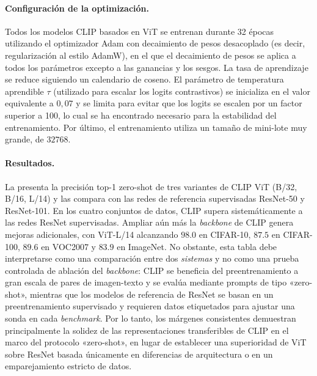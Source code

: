 \documentclass[../../book-main_es.tex]{subfiles}
\begin{document}
\paragraph{Configuración de la optimización.}
Todos los modelos CLIP basados en ViT se entrenan durante 32 épocas utilizando el optimizador Adam 
con decaimiento de pesos desacoplado (es decir, regularización al estilo AdamW), en el que el 
decaimiento de pesos se aplica a todos los parámetros excepto a las ganancias y los sesgos. La tasa 
de aprendizaje se reduce siguiendo un calendario de coseno. El parámetro de temperatura aprendible 
\(\tau\) (utilizado para escalar los logits contrastivos) se inicializa en el valor equivalente a 
\(0,07\) y se limita para evitar que los logits se escalen por un factor superior a 100, lo cual se ha encontrado 
necesario para la estabilidad del entrenamiento. Por último, el entrenamiento utiliza un tamaño 
de mini-lote muy grande, de \(32 768\).

\paragraph{Resultados.} La  presenta la precisión top-1 zero-shot de tres 
variantes de CLIP ViT (B/32, B/16, L/14) y las compara con las 
redes de referencia supervisadas ResNet-50 y ResNet-101.
En los cuatro conjuntos de datos, CLIP supera sistemáticamente a las redes ResNet supervisadas.
Ampliar aún más la \textit{backbone} de CLIP genera mejoras adicionales, con ViT-L/14 alcanzando 
\(98.0\) en CIFAR-10, \(87.5\) en CIFAR-100, \(89.6\) en VOC2007 y \(83.9\) en ImageNet.
No obstante, esta tabla debe interpretarse como una comparación entre dos \emph{sistemas} y no 
como una prueba controlada de ablación del \textit{backbone}: CLIP se beneficia del
preentrenamiento a gran escala de pares de imagen-texto y se evalúa mediante prompts de tipo «zero-shot», 
mientras que los modelos de referencia de ResNet se basan en un preentrenamiento supervisado y 
requieren datos etiquetados para ajustar una sonda en cada \textit{benchmark}.
Por lo tanto, los márgenes consistentes demuestran principalmente la solidez de las 
representaciones transferibles de CLIP en el marco del protocolo «zero-shot», en lugar 
de establecer una superioridad de ViT sobre ResNet basada únicamente en diferencias de arquitectura 
o en un emparejamiento estricto de datos.
\end{document}
